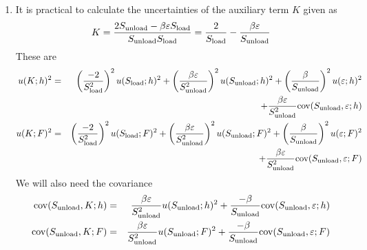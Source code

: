 \begin{enumerate}
\item \label{slopes_unc_K}
It is practical to calculate the uncertainties of the auxiliary term $K$ given as
\begin{equation}
 K = \frac{2 S_{\mathrm{unload}} -\beta \varepsilon S_{\mathrm{load}}}{S_{\mathrm{unload}} S_{\mathrm{load}}} = \frac2{S_{\mathrm{load}}} - \frac{\beta \varepsilon }{S_{\mathrm{unload}}}
\end{equation}
These are
\begin{eqnarray}
 u(K;h)^2  &=& 
 \left( \frac{-2}{S_{\mathrm{load}}^2} \right)^2 u(S_{\mathrm{load}};h)^2 + \left( \frac{\beta \varepsilon}{S_{\mathrm{unload}}^2} \right)^2 u(S_{\mathrm{unload}};h)^2 +  \left( \frac{\beta}{S_{\mathrm{unload}}} \right)^2 u(\varepsilon;h)^2 \nonumber \\ 
 && + \frac{\beta \varepsilon}{S_{\mathrm{unload}}^2} \mathrm{cov}(S_{\mathrm{unload}}, \varepsilon;h) \nonumber\\
u(K;F)^2  &=& \left( \frac{-2}{S_{\mathrm{load}}^2} \right)^2 u(S_{\mathrm{load}};F)^2 + \left( \frac{\beta \varepsilon}{S_{\mathrm{unload}}^2} \right)^2 u(S_{\mathrm{unload}};F)^2 +  \left( \frac{\beta}{S_{\mathrm{unload}}} \right)^2 u(\varepsilon;F)^2 \nonumber\\
&& + \frac{\beta \varepsilon}{S_{\mathrm{unload}}^2} \mathrm{cov}(S_{\mathrm{unload}}, \varepsilon;F) \nonumber \\
\end{eqnarray}
We will also need the covariance
\begin{eqnarray}
 \mathrm{cov}(S_{\mathrm{unload}},K;h) &=& \frac{\beta \varepsilon}{S_{\mathrm{unload}}^2} u(S_{\mathrm{unload}};h)^2 + \frac{-\beta}{S_{\mathrm{unload}}} \mathrm{cov}(S_{\mathrm{unload}}, \varepsilon;h) \nonumber \\
 \mathrm{cov}(S_{\mathrm{unload}},K;F) &=& \frac{\beta \varepsilon}{S_{\mathrm{unload}}^2} u(S_{\mathrm{unload}};F)^2 + \frac{-\beta}{S_{\mathrm{unload}}} \mathrm{cov}(S_{\mathrm{unload}}, \varepsilon;F) \nonumber \\
\end{eqnarray}



\end{enumerate}
